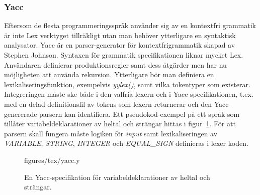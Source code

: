 \subsubsection{Yacc}

Eftersom de flesta programmeringsspråk använder sig av en kontextfri grammatik
är inte Lex verktyget tillräkligt utan man behöver ytterligare en syntaktisk
analysator. Yacc är en parser-generator för kontextfrigrammatik skapad av
Stephen Johnson. Syntaxen för grammatik specifikationen liknar mycket Lex.
Användaren definierar produktionsregler samt dess åtgärder men har nu
möjligheten att använda rekursion. Ytterligare bör man definiera en
lexikaliseringsfunktion, exempelvis \textit{yylex()}, samt vilka tokentyper
som existerar. Integreringen måste ske både i den valfria lexern och i
Yacc-specifikationen, t.ex. med en delad definitionsfil av tokens som lexern
returnerar och den Yacc-genererade parsern kan identifiera. Ett
pseudokod-exempel på ett språk som tillåter variabeldeklarationer av heltal
och strängar hittas i figur~\ref{fig:yacc}. För att parsern skall fungera
måste logiken för \textit{input} samt lexikaliseringen av \textit{VARIABLE},
\textit{STRING},
\textit{INTEGER} och \textit{EQUAL_SIGN} definieras i lexer koden.

\begin{figure}[ht]
    {figures/tex/yacc.y}
  \caption{En Yacc-specifikation för variabeldeklarationer av heltal och
    strängar.}
  \label{fig:yacc}
\end{figure}

